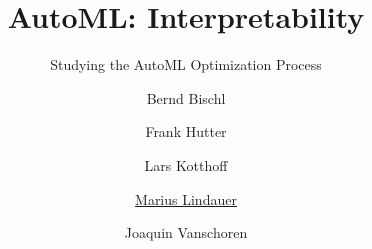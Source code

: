 




\title[AutoML: Optimization Process]{AutoML: Interpretability}
\subtitle{Studying the AutoML Optimization Process}
\author[Marius Lindauer]{Bernd Bischl \and Frank Hutter \and Lars Kotthoff\newline \and \underline{Marius Lindauer} \and Joaquin Vanschoren}
\institute{}
\date{}





	
	\maketitle
	

